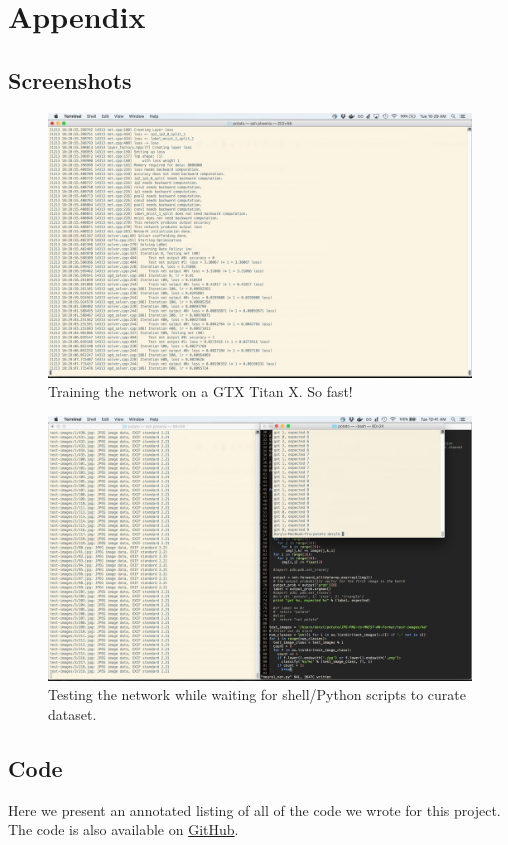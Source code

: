 \documentclass[leqno]{article}
\begin{document}
\clearpage
\section{Appendix}
\subsection{Screenshots}
\begin{figure}[h!]
  \centering
  \includegraphics[width=15cm]{training.png}
  \caption{Training the network on a GTX Titan X. So fast!}
\end{figure}
\begin{figure}[h!]
  \centering
  \includegraphics[width=15cm]{curation_and_test.png}
  \caption{Testing the network while waiting for shell/Python scripts to curate dataset.}
\end{figure}
\subsection{Code}
Here we present an annotated listing of all of the code we wrote for this
project. The code is also available on \href{http://github.com/darylsew/potato}{GitHub}.
\end{document}
